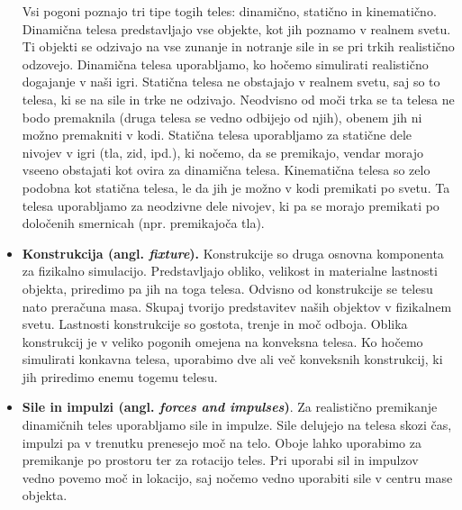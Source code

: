 \documentclass[12pt,a4paper,twoside]{book}
\begin{document}
\begin{itemize}
	Vsi pogoni poznajo tri tipe togih teles: dinamično, statično in kinematično. Dinamična telesa predstavljajo vse objekte, kot jih poznamo v realnem svetu. Ti objekti se odzivajo na vse zunanje in notranje sile in se pri trkih realistično odzovejo. Dinamična telesa uporabljamo, ko hočemo simulirati realistično dogajanje v naši igri. Statična telesa ne obstajajo v realnem svetu, saj so to telesa, ki se na sile in trke ne odzivajo. Neodvisno od moči trka se ta telesa ne bodo premaknila (druga telesa se vedno odbijejo od njih), obenem jih ni možno premakniti v kodi. Statična telesa uporabljamo za statične dele nivojev v igri (tla, zid, ipd.), ki nočemo, da se premikajo, vendar morajo vseeno obstajati kot ovira za dinamična telesa. Kinematična telesa so zelo podobna kot statična telesa, le da jih je možno v kodi premikati po svetu. Ta telesa uporabljamo za neodzivne dele nivojev, ki pa se morajo premikati po določenih smernicah (npr. premikajoča tla).
	\item \textbf{Konstrukcija (angl. \textit{fixture}).} Konstrukcije so druga osnovna komponenta za fizikalno simulacijo. Predstavljajo obliko, velikost in materialne lastnosti objekta, priredimo pa jih na toga telesa. Odvisno od konstrukcije se telesu nato preračuna masa. Skupaj tvorijo predstavitev naših objektov v fizikalnem svetu. Lastnosti konstrukcije so gostota, trenje in moč odboja. Oblika konstrukcij je v veliko pogonih omejena na konveksna telesa. Ko hočemo simulirati konkavna telesa, uporabimo dve ali več konveksnih konstrukcij, ki jih priredimo enemu togemu telesu.
	\item \textbf{Sile in impulzi (angl. \textit{forces and impulses})}. Za realistično premikanje dinamičnih teles uporabljamo sile in impulze. Sile delujejo na telesa skozi čas, impulzi pa v trenutku prenesejo moč na telo. Oboje lahko uporabimo za premikanje po prostoru ter za rotacijo teles. Pri uporabi sil in impulzov vedno povemo moč in lokacijo, saj nočemo vedno uporabiti sile v centru mase objekta.
	

\end{itemize}
\end{document}
